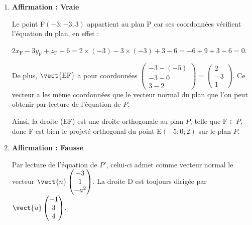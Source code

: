 \begin{enumerate}
$\begin{aligned}
\begin{cases}
t = 7-2t'\\
3t' = 18\\
9t' = 27
\end{cases}
&\iff
\begin{cases}
t = 7-2t'\\
t' = 6\\
t' = 3
\end{cases}\\
\end{aligned}$

Les équations du système sont incompatibles, donc le système n'a pas de solution, et les droites D et $\Delta$ n'ont aucun point commun : elle ne sont donc pas sécantes.

\item \textbf{Affirmation : Vraie}

Le point F$(-3 ;-3 ; 3)$ appartient au plan P car ses coordonnées vérifient l'équation du plan, en effet :

$2x_{\mathrm{F}} -3y_{\mathrm{F}}+z_{\mathrm{F}}-6 = 2\times (-3) - 3\times (-3) + 3 - 6 = -6 + 9 + 3 - 6 = 0$.

De plus, $\vect{\mathrm{EF}}$ a pour coordonnées $\begin{pmatrix}-3 - (-5) \\ -3 - 0\\3 - 2\end{pmatrix} = \begin{pmatrix}2\\-3\\1\end{pmatrix}$. Ce vecteur a les même coordonnées que le vecteur normal du plan que l'on peut obtenir par lecture de l'équation de $P$.

Ainsi, la droite (EF) est une droite orthogonale au plan $P$, telle que $\mathrm{F} \in P$, donc F est bien le projeté orthogonal du point E$(-5 ; 0 ; 2)$ sur le plan $P$.

\item \textbf{Affirmation : Fausse}

Par lecture de l'équation de $P'$, celui-ci admet comme vecteur normal le vecteur $\vect{n}\begin{pmatrix}-3\\1\\-a^2\end{pmatrix}$. La droite D est toujours dirigée par $\vect{u}\begin{pmatrix}-1\\3\\4\end{pmatrix}$.


\end{enumerate}
